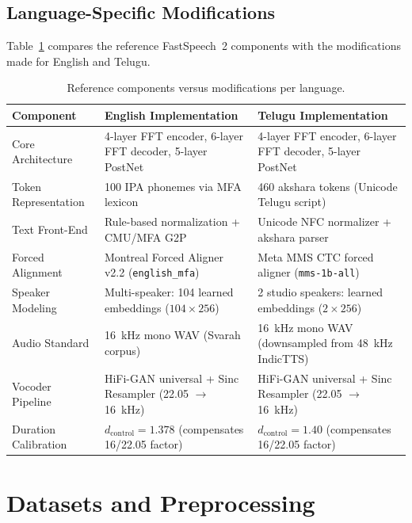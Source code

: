 \documentclass[11pt,a4paper]{report}
\begin{document}
\section{Language-Specific Modifications}
Table~\ref{tab:changes} compares the reference FastSpeech~2 components with the modifications made for English and Telugu.

\begin{table}[!htbp]
\centering
\caption{Reference components versus modifications per language.}
\label{tab:changes}
\small
\begin{tabularx}{\textwidth}{>{\raggedright\arraybackslash}p{3.2cm}XX}
\toprule
\textbf{Component} & \textbf{English Implementation} & \textbf{Telugu Implementation} \\
\midrule
Core Architecture & 4-layer FFT encoder, 6-layer FFT decoder, 5-layer PostNet & 4-layer FFT encoder, 6-layer FFT decoder, 5-layer PostNet \\
Token Representation & 100 IPA phonemes via MFA lexicon & 460 akshara tokens (Unicode Telugu script) \\
Text Front-End & Rule-based normalization + CMU/MFA G2P & Unicode NFC normalizer + akshara parser \\
Forced Alignment & Montreal Forced Aligner v2.2 (\texttt{english\_mfa}) & Meta MMS CTC forced aligner (\texttt{mms-1b-all}) \\
Speaker Modeling & Multi-speaker: 104 learned embeddings ($104 \times 256$) & 2 studio speakers: learned embeddings ($2 \times 256$) \\
Audio Standard & 16~kHz mono WAV (Svarah corpus) & 16~kHz mono WAV (downsampled from 48~kHz IndicTTS) \\
Vocoder Pipeline & HiFi-GAN universal + Sinc Resampler (22.05 $\to$ 16~kHz) & HiFi-GAN universal + Sinc Resampler (22.05 $\to$ 16~kHz) \\
Duration Calibration & $d_{\text{control}} = 1.378$ (compensates 16/22.05 factor) & $d_{\text{control}} = 1.40$ (compensates 16/22.05 factor) \\
\bottomrule
\end{tabularx}
\end{table}

\FloatBarrier
\vspace{1.5em}

\chapter{Datasets and Preprocessing}
\end{document}
